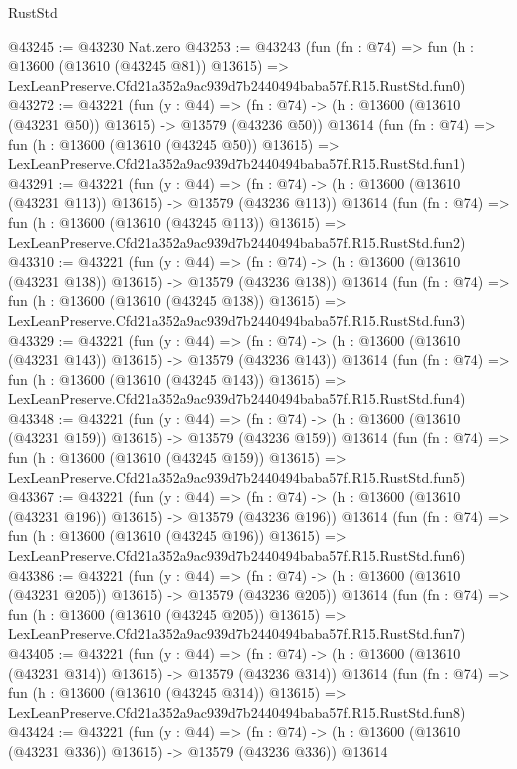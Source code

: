 \begin{lexlean}{RustStd}
\begin{coremodule}
@43245 := @43230 Nat.zero
@43253 := @43243
    (fun (fn : @74) =>
    fun (h : @13600 (@13610 (@43245 @81)) @13615) =>
    LexLeanPreserve.Cfd21a352a9ac939d7b2440494baba57f.R15.RustStd.fun0)
@43272 := @43221
    (fun (y : @44) =>
    (fn : @74) -> (h : @13600 (@13610 (@43231 @50)) @13615) -> @13579 (@43236 @50))
    @13614
    (fun (fn : @74) =>
    fun (h : @13600 (@13610 (@43245 @50)) @13615) =>
    LexLeanPreserve.Cfd21a352a9ac939d7b2440494baba57f.R15.RustStd.fun1)
@43291 := @43221
    (fun (y : @44) =>
    (fn : @74) -> (h : @13600 (@13610 (@43231 @113)) @13615) -> @13579 (@43236 @113))
    @13614
    (fun (fn : @74) =>
    fun (h : @13600 (@13610 (@43245 @113)) @13615) =>
    LexLeanPreserve.Cfd21a352a9ac939d7b2440494baba57f.R15.RustStd.fun2)
@43310 := @43221
    (fun (y : @44) =>
    (fn : @74) -> (h : @13600 (@13610 (@43231 @138)) @13615) -> @13579 (@43236 @138))
    @13614
    (fun (fn : @74) =>
    fun (h : @13600 (@13610 (@43245 @138)) @13615) =>
    LexLeanPreserve.Cfd21a352a9ac939d7b2440494baba57f.R15.RustStd.fun3)
@43329 := @43221
    (fun (y : @44) =>
    (fn : @74) -> (h : @13600 (@13610 (@43231 @143)) @13615) -> @13579 (@43236 @143))
    @13614
    (fun (fn : @74) =>
    fun (h : @13600 (@13610 (@43245 @143)) @13615) =>
    LexLeanPreserve.Cfd21a352a9ac939d7b2440494baba57f.R15.RustStd.fun4)
@43348 := @43221
    (fun (y : @44) =>
    (fn : @74) -> (h : @13600 (@13610 (@43231 @159)) @13615) -> @13579 (@43236 @159))
    @13614
    (fun (fn : @74) =>
    fun (h : @13600 (@13610 (@43245 @159)) @13615) =>
    LexLeanPreserve.Cfd21a352a9ac939d7b2440494baba57f.R15.RustStd.fun5)
@43367 := @43221
    (fun (y : @44) =>
    (fn : @74) -> (h : @13600 (@13610 (@43231 @196)) @13615) -> @13579 (@43236 @196))
    @13614
    (fun (fn : @74) =>
    fun (h : @13600 (@13610 (@43245 @196)) @13615) =>
    LexLeanPreserve.Cfd21a352a9ac939d7b2440494baba57f.R15.RustStd.fun6)
@43386 := @43221
    (fun (y : @44) =>
    (fn : @74) -> (h : @13600 (@13610 (@43231 @205)) @13615) -> @13579 (@43236 @205))
    @13614
    (fun (fn : @74) =>
    fun (h : @13600 (@13610 (@43245 @205)) @13615) =>
    LexLeanPreserve.Cfd21a352a9ac939d7b2440494baba57f.R15.RustStd.fun7)
@43405 := @43221
    (fun (y : @44) =>
    (fn : @74) -> (h : @13600 (@13610 (@43231 @314)) @13615) -> @13579 (@43236 @314))
    @13614
    (fun (fn : @74) =>
    fun (h : @13600 (@13610 (@43245 @314)) @13615) =>
    LexLeanPreserve.Cfd21a352a9ac939d7b2440494baba57f.R15.RustStd.fun8)
@43424 := @43221
    (fun (y : @44) =>
    (fn : @74) -> (h : @13600 (@13610 (@43231 @336)) @13615) -> @13579 (@43236 @336))
    @13614

\end{coremodule}
\end{lexlean}
